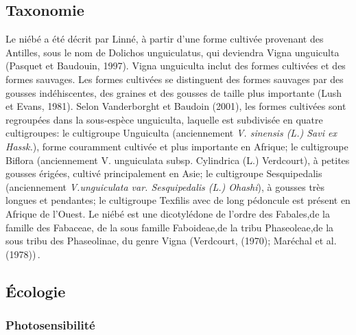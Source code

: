 \documentclass[a4paper,11pt]{article}
\begin{document}
\subsection{Taxonomie}

Le niébé a été décrit par Linné, à partir d’une forme cultivée
provenant des Antilles, sous le nom de Dolichos unguiculatus, qui
deviendra Vigna unguiculta (Pasquet et Baudouin, 1997). Vigna
unguiculta inclut des formes cultivées et des formes sauvages. Les
formes cultivées se distinguent des formes sauvages par des gousses
indéhiscentes, des graines et des gousses de taille plus importante
(Lush et Evans, 1981). Selon Vanderborght et Baudoin (2001), les
formes cultivées sont regroupées dans la sous-espèce unguiculta,
laquelle est subdivisée en quatre cultigroupes: le cultigroupe
Unguiculta (anciennement \emph{ V. sinensis (L.) Savi ex Hassk.}), forme
couramment cultivée et plus importante en Afrique; le cultigroupe
Biflora (anciennement V. unguiculata subsp. Cylindrica (L.) Verdcourt),
à petites gousses érigées, cultivé principalement en Asie; le
cultigroupe Sesquipedalis (anciennement \emph{V.unguiculata
var. Sesquipedalis (L.) Ohashi}), à gousses très longues et pendantes;
le cultigroupe Texfilis avec de long pédoncule est présent en Afrique de l’Ouest. Le
niébé est une dicotylédone de l’ordre des Fabales,de la famille des Fabaceae,
de la sous famille Faboideae,de la tribu Phaseoleae,de la sous tribu des Phaseolinae,
du genre Vigna (Verdcourt, (1970); Maréchal et al. (1978))\,\cite{Sawadogo_2009}.

\subsection{Écologie}

\subsubsection{Photosensibilité}
\end{document}
